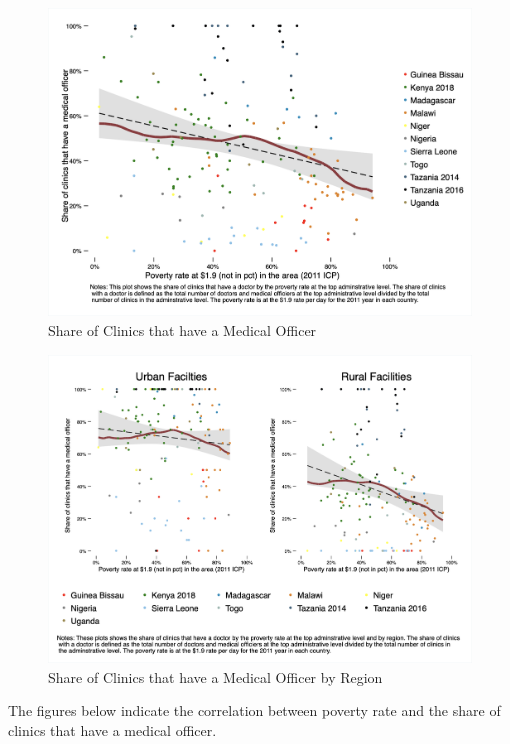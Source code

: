 \documentclass{article}                 %
\begin{document}
			\begin{figure}[H] 
				\centering
				\caption{Share of Clinics that have a Medical Officer} 
				\includegraphics[width=\textwidth]{"../Output/Final/Poverty_medone_allcountries"}
			\end{figure}
		
			\begin{figure}[H] 
				\centering
				\caption{Share of Clinics that have a Medical Officer by Region} 
				\includegraphics[width=\textwidth]{"../Output/Final/Poverty_medone_region"}
			\end{figure}
	
	
	The figures below indicate the correlation between poverty rate and the share of clinics that have a medical officer.
	
\end{document}
